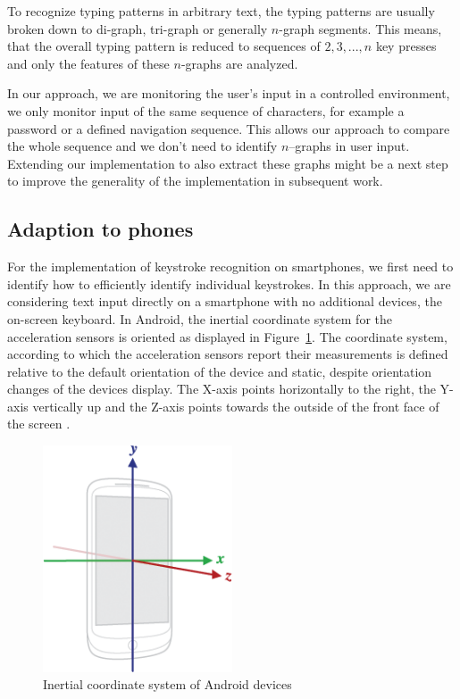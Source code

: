 To recognize typing patterns in arbitrary text, the typing patterns are usually broken down to di-graph, tri-graph or generally $n$-graph segments. This means, that the overall typing pattern is reduced to sequences of $2, 3, ..., n$ key presses and only the features of these $n$-graphs are analyzed.

In our approach, we are monitoring the user's input in a controlled environment, \ie we only monitor input of the same sequence of characters, for example a password or a defined navigation sequence. This allows our approach to compare the whole sequence and we don't need to identify $n$--graphs in user input. Extending our implementation to also extract these graphs might be a next step to improve the generality of the implementation in subsequent work.

\subsection{Adaption to phones}\label{subsection:phones}
For the implementation of keystroke recognition on smartphones, we first need to identify how to efficiently identify individual keystrokes. In this approach, we are considering text input directly on a smartphone with no additional devices, \ie the on-screen keyboard.
In Android, the inertial coordinate system for the acceleration sensors is oriented as displayed in Figure~\ref{fig:deviceaxis}. The coordinate system, according to which the acceleration sensors report their measurements is defined relative to the default orientation of the device and static, despite orientation changes of the devices display. The X-axis points horizontally to the right, the Y-axis vertically up and the Z-axis points towards the outside of the front face of the screen \cite{sensoreventandroidreference}.

\begin{figure}
    \centering
    \includegraphics[width=0.5\textwidth]{figures/axis_device.png}
    \caption{Inertial coordinate system of Android devices \cite{sensoreventandroidreference}}
    \label{fig:deviceaxis}
\end{figure}

